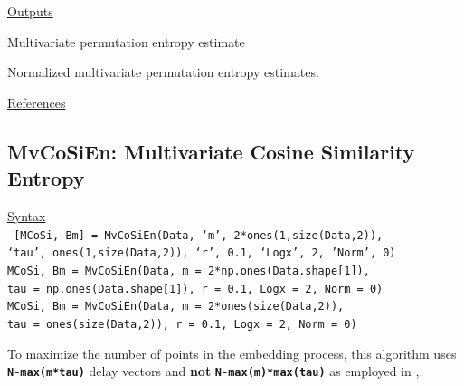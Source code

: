 \documentclass[12pt, a4paper, titlepage, openany]{book}
\begin{document}
\noindent \ul{Outputs}
\begin{description}[labelsep=1cm, labelwidth=2cm, nosep, style=multiline,leftmargin=3cm]\footnotesize
\item[\texttt{MPerm}]	 Multivariate permutation entropy estimate
\item[\texttt{MPnorm}]		Normalized multivariate permutation entropy estimates.
\end{description} 

\noindent \ul{References}\hspace{1cm}
\cite{Matt1} \cite{MvSamp1}




\newpage
\subsection{\normalsize MvCoSiEn: \hspace{15mm} Multivariate Cosine Similarity Entropy}\label{MvCoSiEn}
\noindent\ul{Syntax} \vspace{6mm} \\ \noindent \texttt{\footnotesize
[MCoSi, Bm] = MvCoSiEn(Data, ‘m’, 2*ones(1,size(Data,2)), \\ \indent ‘tau’, ones(1,size(Data,2)), ‘r’, 0.1, ‘Logx’, 2, 'Norm', 0) \\
MCoSi, Bm  = MvCoSiEn(Data, m = 2*np.ones(Data.shape[1]),  \\ \indent tau = np.ones(Data.shape[1]), r = 0.1, Logx = 2, Norm = 0) \\
MCoSi, Bm  = MvCoSiEn(Data, m = 2*ones(size(Data,2)), \\ \indent tau = ones(size(Data,2)), r = 0.1, Logx = 2, Norm = 0)}

\begin{tcolorbox}[colback=ehone!5, colframe=ehtwo!, title=\hypertarget{bidinote}{\textbf{NOTE}}, label={BiBox}]
To maximize the number of points in the embedding process, this algorithm uses \texttt{\textbf{N-max(m*tau)}} delay vectors and \textbf{not} \texttt{\textbf{N-max(m)*max(tau)}} as employed in \cite{MvCoSi1},\cite{MvSamp1}.
\end{tcolorbox}
\end{document}
